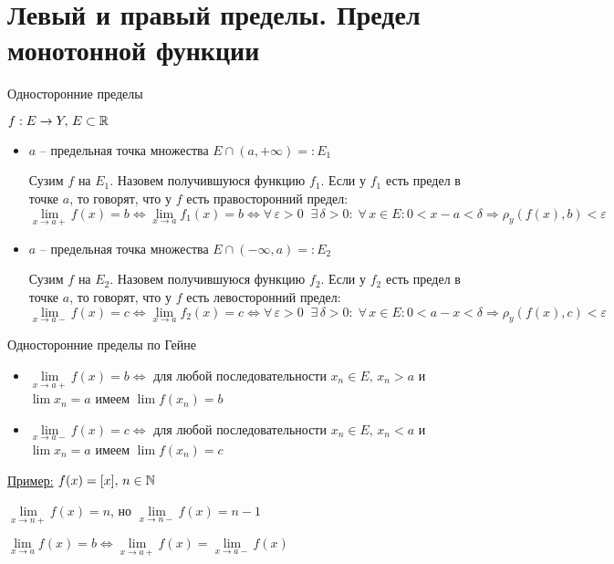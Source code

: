 \section{Левый и правый пределы. Предел монотонной функции}
\begin{conj}
    Односторонние пределы
\end{conj}
$f : E \to Y, \, E \subset \mathbb{R}$
\begin{itemize}
    \item $a$ -- предельная точка множества $E \cap (a, +\infty) =: E_1$
    
    Сузим $f$ на $E_1$. Назовем получившуюся функцию $f_1$. 
    Если у $f_1$ есть предел в точке $a$, то говорят, что у $f$ есть правосторонний предел:
    \[ \lim_{x \to a+} f(x) = b \Longleftrightarrow \lim_{x \to a} f_1(x) = b \Longleftrightarrow 
    \forall \, \varepsilon > 0 \;\; \exists \, \delta > 0 : \; \forall \, x \in E : 0 < x - a < \delta \Rightarrow\rho_y(f(x), b) < \varepsilon \]
    
    \item $a$ -- предельная точка множества $E \cap (-\infty, a) =: E_2$
    
    Сузим $f$ на $E_2$. Назовем получившуюся функцию $f_2$.
    Если у $f_2$ есть предел в точке $a$, то говорят, что у $f$ есть левосторонний предел:
    \[ \lim_{x \to a-} f(x) = c \Longleftrightarrow \lim_{x \to a} f_2(x) = c \Longleftrightarrow 
    \forall \, \varepsilon > 0 \;\; \exists \, \delta > 0 : \; \forall \, x \in E : 0 < a - x < \delta \Rightarrow\rho_y(f(x), c) < \varepsilon \]
\end{itemize}
\begin{conj}
    Односторонние пределы по Гейне
\end{conj}
\begin{itemize}
    \item $\lim\limits_{x \to a+} f(x) = b \Longleftrightarrow$ для любой последовательности $x_n \in E, \, x_n > a$ и $\lim x_n = a$ имеем $\lim f(x_n) = b$
    \item $\lim\limits_{x \to a-} f(x) = c \Longleftrightarrow$ для любой последовательности $x_n \in E, \, x_n < a$ и $\lim x_n = a$ имеем $\lim f(x_n) = c$
\end{itemize}
\underline{Пример:} $f(x) = [x], \, n \in \mathbb{N}$

$\lim\limits_{x \to n+} f(x) = n$, но $\lim\limits_{x \to n-} f(x) = n - 1$

\begin{notice}
    $\lim\limits_{x \to a} f(x) = b \Longleftrightarrow \lim\limits_{x \to a+} f(x) = \lim\limits_{x \to a-} f(x)$
\end{notice}

